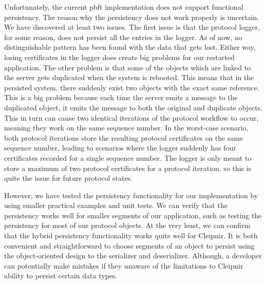 Unfortunately, the current \ac{pbft} implementation does not support functional persistency. The reason why the persistency does not work properly is uncertain. We have discovered at least two issues. The first issue is that the protocol logger, for some reason, does not persist all the entries in the logger. As of now, no distinguishable pattern has been found with the data that gets lost. Either way, losing certificates in the logger does create big problems for our restarted application. The other problem is that some of the  objects which are linked to the server gets duplicated when the system is rebooted. This means that in the persisted system, there suddenly exist two  objects with the exact same reference. This is a big problem because each time the server emits a message to the duplicated  object, it emits the message to both the original and duplicate  objects. This in turn can cause two identical iterations of the protocol workflow to occur, meaning they work on the same sequence number. In the worst-case scenario, both protocol iterations store the resulting protocol certificates on the same sequence number, leading to scenarios where the logger suddenly has four certificates recorded for a single sequence number. The logger is only meant to store a maximum of two protocol certificates for a protocol iteration, so this is quite the issue for future protocol states.

However, we have tested the persistency functionality for our implementation by using smaller practical examples and unit tests. We can verify that the persistency works well for smaller segments of our application, such as testing the persistency for most of our protocol objects.
At the very least, we can confirm that the hybrid persistency functionality works quite well for Cleipnir. It is both convenient and straightforward to choose segments of an object to persist using the object-oriented design to the serializer and deserializer. Although, a developer can potentially make mistakes if they unaware of the limitations to Cleipnir ability to persist certain data types.
\fi